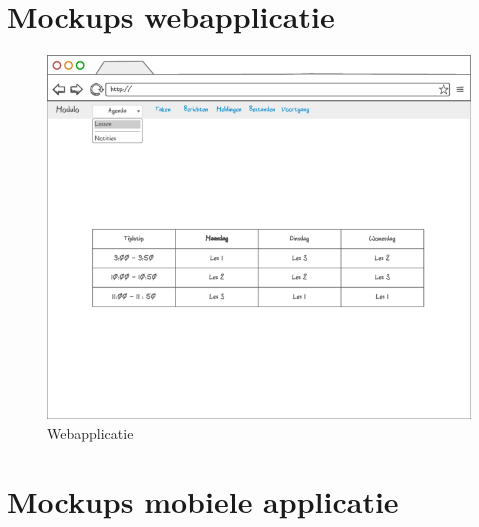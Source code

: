 \documentclass[a4paper]{article}
\begin{document}
\newpage
\begin{appendices}
\section{Mockups webapplicatie}

\begin{figure}[H]
  \centerline{\includegraphics[width=\textwidth]{web}}
  \caption{Webapplicatie}
  \label{fig:web}
\end{figure}

\newpage
\section{Mockups mobiele applicatie}


\end{appendices}
\end{document}

